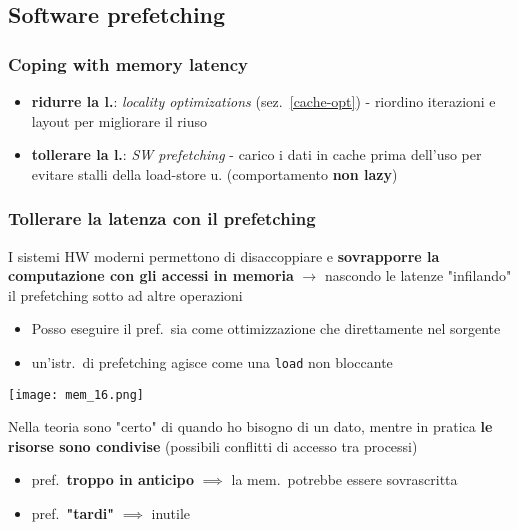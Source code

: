 \subsection{Software prefetching}

\subsubsection{Coping with memory latency}

\begin{itemize}
  \item \textbf{ridurre la l.}: \textit{locality optimizations} (sez.~\ref{cache-opt})  - riordino iterazioni e layout per migliorare il riuso
  \item \textbf{tollerare la l.}: \textit{SW prefetching} - carico i dati in cache prima dell'uso per evitare stalli della load-store u. (comportamento \textbf{non lazy})
\end{itemize}

\subsubsection{Tollerare la latenza con il prefetching}

I sistemi HW moderni permettono di disaccoppiare e \textbf{sovrapporre la computazione con gli accessi in memoria} $\rightarrow$ nascondo le latenze "infilando" il prefetching sotto ad altre operazioni

\vspace{.5em}
\noindent\begin{minipage}[b]{.5\textwidth}
\begin{itemize}
  \item Posso eseguire il pref.~sia come ottimizzazione che direttamente nel sorgente
  \item un'istr.~di prefetching agisce come una \lstinline|load| non bloccante
\end{itemize}
\end{minipage}\hfill
\begin{minipage}[c]{.4\textwidth}
\texttt{[image: mem\_16.png]}
\end{minipage}

\begin{emphasize}[frametitle={Problemi pratici nel calcolo del prefetching}]
    Nella teoria sono "certo" di quando ho bisogno di un dato, mentre in pratica \textbf{le risorse sono condivise} (possibili conflitti di accesso tra processi)
    \begin{itemize}
      \item pref.~\textbf{troppo in anticipo} $\implies$ la mem.~potrebbe essere sovrascritta
      \item pref.~\textbf{"tardi"} $\implies$ inutile
    \end{itemize}
    
\end{emphasize}

